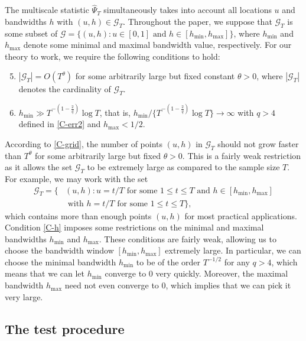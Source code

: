 The multiscale statistic $\widehat{\Psi}_T$ simultaneously takes into account all locations $u$ and bandwidths $h$ with $(u,h) \in \mathcal{G}_T$. Throughout the paper, we suppose that $\mathcal{G}_T$ is some subset of $\mathcal{G} = \{ (u,h): u \in [0,1] \text{ and } h \in [h_{\min},h_{\max}] \}$, where $h_{\min}$ and $h_{\max}$ denote some minimal and maximal bandwidth value, respectively. For our theory to work, we require the following conditions to hold:
\begin{enumerate}[label=(C\arabic*),leftmargin=1.05cm]
\setcounter{enumi}{4}

\item \label{C-grid} $|\mathcal{G}_T| = O(T^\theta)$ for some arbitrarily large but fixed constant $\theta > 0$, where $|\mathcal{G}_T|$ denotes the cardinality of $\mathcal{G}_T$. 

\item \label{C-h} $h_{\min} \gg T^{-(1-\frac{2}{q})} \log T$, that is, $h_{\min} / \{ T^{-(1-\frac{2}{q})} \log T \} \rightarrow \infty$ with $q > 4$ defined in \ref{C-err2} and $h_{\max} < 1/2$.

\end{enumerate}
According to \ref{C-grid}, the number of points $(u,h)$ in $\mathcal{G}_T$ should not grow faster than $T^\theta$ for some arbitrarily large but fixed $\theta > 0$. This is a fairly weak restriction as it allows the set $\mathcal{G}_T$ to be extremely large as compared to the sample size $T$. For example, we may work with the set 
\begin{align*}
\mathcal{G}_T = \big\{ & (u,h): u = t/T \text{ for some } 1 \le t \le T \text{ and } h \in [h_{\min},h_{\max}] \\ & \text{ with } h = t/T \text{ for some } 1 \le t \le T  \big\},
\end{align*}
which contains more than enough points $(u,h)$ for most practical applications. Condition \ref{C-h} imposes some restrictions on the minimal and maximal bandwidths $h_{\min}$ and $h_{\max}$. These conditions are fairly weak, allowing us to choose the bandwidth window $[h_{\min},h_{\max}]$ extremely large. In particular, we can choose the minimal bandwidth $h_{\min}$ to be of the order $T^{-1/2}$ for any $q > 4$, which means that we can let $h_{\min}$ converge to $0$ very quickly. Moreover, the maximal bandwidth $h_{\max}$ need not even converge to $0$, which implies that we can pick it very large.


\subsection{The test procedure}\label{subsec-method-test}


